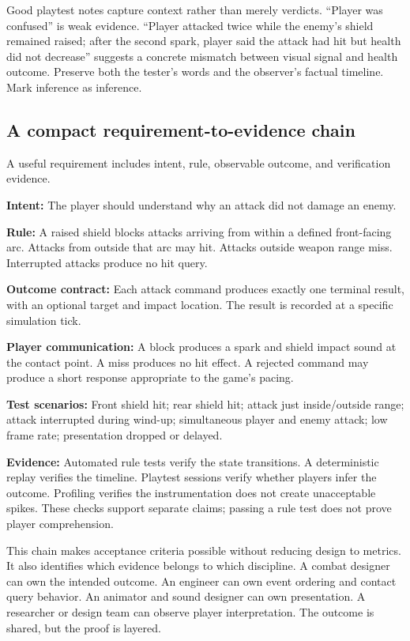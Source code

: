 Good playtest notes capture context rather than merely verdicts. ``Player was confused'' is weak evidence. ``Player attacked twice while the enemy's shield remained raised; after the second spark, player said the attack had hit but health did not decrease'' suggests a concrete mismatch between visual signal and health outcome. Preserve both the tester's words and the observer's factual timeline. Mark inference as inference.

\subsection{A compact requirement-to-evidence chain}\label{06-engine-ii-ch041-a-compact-requirement-to-evidence-chain}

\hypertarget{06-engine-ii-ch041-a-compact-requirement-to-evidence-chain}{}

A useful requirement includes intent, rule, observable outcome, and verification evidence.

\textbf{Intent:} The player should understand why an attack did not damage an enemy.

\textbf{Rule:} A raised shield blocks attacks arriving from within a defined front-facing arc. Attacks from outside that arc may hit. Attacks outside weapon range miss. Interrupted attacks produce no hit query.

\textbf{Outcome contract:} Each attack command produces exactly one terminal result, with an optional target and impact location. The result is recorded at a specific simulation tick.

\textbf{Player communication:} A block produces a spark and shield impact sound at the contact point. A miss produces no hit effect. A rejected command may produce a short response appropriate to the game's pacing.

\textbf{Test scenarios:} Front shield hit; rear shield hit; attack just inside/outside range; attack interrupted during wind-up; simultaneous player and enemy attack; low frame rate; presentation dropped or delayed.

\textbf{Evidence:} Automated rule tests verify the state transitions. A deterministic replay verifies the timeline. Playtest sessions verify whether players infer the outcome. Profiling verifies the instrumentation does not create unacceptable spikes. These checks support separate claims; passing a rule test does not prove player comprehension.

This chain makes acceptance criteria possible without reducing design to metrics. It also identifies which evidence belongs to which discipline. A combat designer can own the intended outcome. An engineer can own event ordering and contact query behavior. An animator and sound designer can own presentation. A researcher or design team can observe player interpretation. The outcome is shared, but the proof is layered.

